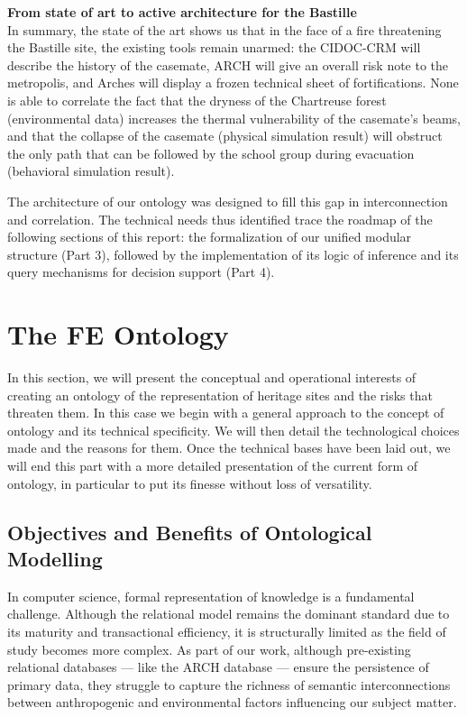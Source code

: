 \documentclass{article}
\begin{document}
\begin{filrouge}
\textbf {From state of art to active architecture for the Bastille} \\
In summary, the state of the art shows us that in the face of a fire threatening the Bastille site, the existing tools remain unarmed: the CIDOC-CRM will describe the history of the casemate, ARCH will give an overall risk note to the metropolis, and Arches will display a frozen technical sheet of fortifications. None is able to correlate the fact that the dryness of the Chartreuse forest (environmental data) increases the thermal vulnerability of the casemate's beams, and that the collapse of the casemate (physical simulation result) will obstruct the only path that can be followed by the school group during evacuation (behavioral simulation result).

The architecture of our ontology was designed to fill this gap in interconnection and correlation. The technical needs thus identified trace the roadmap of the following sections of this report: the formalization of our unified modular structure (Part 3), followed by the implementation of its logic of inference and its query mechanisms for decision support (Part 4).
\end{filrouge}
\clearpage

\section{The FE Ontology}
In this section, we will present the conceptual and operational interests of creating an ontology of the representation of heritage sites and the risks that threaten them. In this case we begin with a general approach to the concept of ontology and its technical specificity. We will then detail the technological choices made and the reasons for them. Once the technical bases have been laid out, we will end this part with a more detailed presentation of the current form of ontology, in particular to put its finesse without loss of versatility.

\subsection{Objectives and Benefits of Ontological Modelling}

In computer science, formal representation of knowledge is a fundamental challenge. Although the relational model remains the dominant standard due to its maturity and transactional efficiency, it is structurally limited as the field of study becomes more complex. As part of our work, although pre-existing relational databases — like the ARCH database — ensure the persistence of primary data, they struggle to capture the richness of semantic interconnections between anthropogenic and environmental factors influencing our subject matter.
\end{document}
